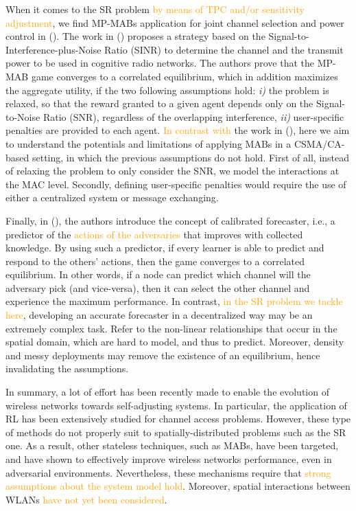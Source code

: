 \documentclass[preprint,12pt]{elsarticle}
\begin{document}
When it comes to the SR problem \textcolor{orange}{by means of TPC and/or sensitivity adjustment}, we find MP-MABs application for joint channel selection and power control in (\citealp{maghsudi2015joint, maghsudi2015channel}). The work in (\citealp{maghsudi2015joint}) proposes a strategy based on the Signal-to-Interference-plus-Noise Ratio (SINR) to determine the channel and the transmit power to be used in cognitive radio networks. The authors prove that the MP-MAB game converges to a correlated equilibrium, which in addition maximizes the aggregate utility, if the two following assumptions hold: \emph{i)} the problem is relaxed, so that the reward granted to a given agent depends only on the Signal-to-Noise Ratio (SNR), regardless of the overlapping interference, \emph{ii)} user-specific penalties are provided to each agent. \textcolor{orange}{In contrast with} the work in (\citealp{maghsudi2015joint}), here we aim to understand the potentials and limitations of applying MABs in a CSMA/CA-based setting, in which the previous assumptions do not hold. First of all, instead of relaxing the problem to only consider the SNR, we model the interactions at the MAC level. Secondly, defining user-specific penalties would require the use of either a centralized system or message exchanging.

Finally, in (\citealp{maghsudi2015channel}), the authors introduce the concept of calibrated forecaster, i.e., a predictor of the \textcolor{orange}{actions of the adversaries} that improves with collected knowledge. By using such a predictor, if every learner is able to predict and respond to the others' actions, then the game converges to a correlated equilibrium. In other words, if a node can predict which channel will the adversary pick (and vice-versa), then it can select the other channel and experience the maximum performance. In contrast, \textcolor{orange}{in the SR problem we tackle here}, developing an accurate forecaster in a decentralized way may be an extremely complex task. Refer to the non-linear relationships that occur in the spatial domain, which are hard to model, and thus to predict. Moreover, density and messy deployments may remove the existence of an equilibrium, hence invalidating the assumptions.

In summary, a lot of effort has been recently made to enable the evolution of wireless networks towards self-adjusting systems. In particular, the application of RL has been extensively studied for channel access problems. However, these type of methods do not properly suit to spatially-distributed problems such as the SR one. As a result, other stateless techniques, such as MABs, have been targeted, and have shown to effectively improve wireless networks performance, even in adversarial environments. Nevertheless, these mechanisms require that \textcolor{orange}{strong assumptions about the system model hold}. Moreover, spatial interactions between WLANs \textcolor{orange}{have not yet been considered}.
\end{document}
